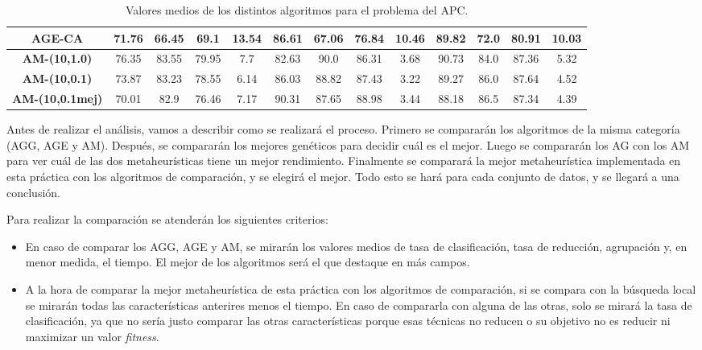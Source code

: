 \documentclass[11pt,a4paper]{article}
\begin{document}
\begin{table}[H]
{\begin{tabular}{c|c|c|c|c|c|c|c|c|c|c|c|c|}
\multicolumn{1}{|c|}{\textbf{AGE-CA}}         & 71.76             & 66.45                   & 69.1          & 13.54      & 86.61             & 67.06          & 76.84         & 10.46      & 89.82             & 72.0           & 80.91         & 10.03      \\ \hline
\multicolumn{1}{|c|}{\textbf{AM-(10,1.0)}}    & 76.35             & 83.55                   & 79.95         & 7.7        & 82.63             & 90.0           & 86.31         & 3.68       & 90.73             & 84.0           & 87.36         & 5.32       \\ \hline
\multicolumn{1}{|c|}{\textbf{AM-(10,0.1)}}    & 73.87             & 83.23                   & 78.55         & 6.14       & 86.03             & 88.82          & 87.43         & 3.22       & 89.27             & 86.0           & 87.64         & 4.52       \\ \hline
\multicolumn{1}{|c|}{\textbf{AM-(10,0.1mej)}} & 70.01             & 82.9                    & 76.46         & 7.17       & 90.31             & 87.65          & 88.98         & 3.44       & 88.18             & 86.5           & 87.34         & 4.39       \\ \hline
\end{tabular}
}%
\caption{Valores medios de los distintos algoritmos para el problema del APC.}
\end{table}

Antes de realizar el análisis, vamos a describir como se realizará el proceso. Primero se compararán los algoritmos de la misma
categoría (AGG, AGE y AM). Después, se compararán los mejores genéticos para decidir cuál es el mejor. Luego se compararán los AG
con los AM para ver cuál de las dos metaheurísticas tiene un mejor rendimiento. Finalmente se comparará la mejor metaheurística
implementada en esta práctica con los algoritmos de comparación, y se elegirá el mejor. Todo esto se hará para cada conjunto de
datos, y se llegará a una conclusión.

Para realizar la comparación se atenderán los siguientes criterios:

\begin{itemize}
	\item En caso de comparar los AGG, AGE y AM, se mirarán los valores medios de tasa de clasificación, tasa de reducción,
	agrupación y, en menor medida, el tiempo. El mejor de los algoritmos será el que destaque en más campos.
	\item A la hora de comparar la mejor metaheurística de esta práctica con los algoritmos de comparación, si se compara con
	la búsqueda local se mirarán todas las características anterires menos el tiempo. En caso de compararla con alguna
	de las otras, solo se mirará la tasa de clasificación, ya que no sería justo comparar las otras características porque esas
	técnicas no reducen o su objetivo no es reducir ni maximizar un valor \textit{fitness}.
\end{itemize}
\end{document}
